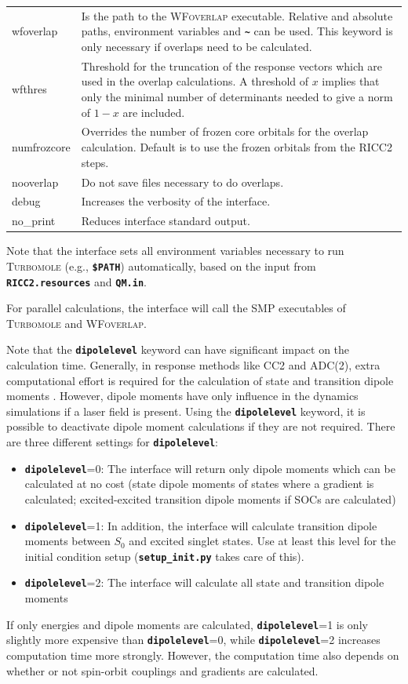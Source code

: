 \documentclass[a4paper,10pt,DIV=15,openany]{scrbook}
\newcommand{\ttt}[1]{\textbf{\texttt{#1}}}
\begin{document}
\begin{table}
\begin{tabular}{>{\ttfamily}lp{12cm}}
wfoverlap       &Is the path to the \textsc{WFoverlap} executable. Relative and absolute paths, environment variables and \ttt{\textasciitilde} can be used. This keyword is only necessary if overlaps need to be calculated.\\
wfthres         &Threshold for the truncation of the response vectors which are used in the overlap calculations. A threshold of $x$ implies that only the minimal number of determinants needed to give a norm of $1-x$ are included.\\
numfrozcore     &Overrides the number of frozen core orbitals for the overlap calculation. Default is to use the frozen orbitals from the RICC2 steps.\\
nooverlap       &Do not save files necessary to do overlaps.\\
debug           &Increases the verbosity of the interface.\\
  no\_print       &Reduces interface standard output.\\
  \hline
  \end{tabular}
\end{table}

Note that the interface sets all environment variables necessary to run \textsc{Turbomole} (e.g., \ttt{\$PATH}) automatically, based on the input from \ttt{RICC2.resources} and \ttt{QM.in}.

For parallel calculations, the interface will call the SMP executables of \textsc{Turbomole} and \textsc{WFoverlap}.

Note that the \ttt{dipolelevel} keyword can have significant impact on the calculation time.
Generally, in response methods like CC2 and ADC(2), extra computational effort is required for the calculation of state and transition dipole moments .
However, dipole moments have only influence in the dynamics simulations if a laser field is present.
Using the \ttt{dipolelevel} keyword, it is possible to deactivate dipole moment calculations if they are not required.
There are three different settings for \ttt{dipolelevel}: 
\begin{itemize}
  \item \ttt{dipolelevel}=0: The interface will return only dipole moments which can be calculated at no cost (state dipole moments of states where a gradient is calculated; excited-excited transition dipole moments if SOCs are calculated)
  \item \ttt{dipolelevel}=1: In addition, the interface will calculate transition dipole moments between $S_0$ and excited singlet states. Use at least this level for the initial condition setup (\ttt{setup\_init.py} takes care of this).
  \item \ttt{dipolelevel}=2: The interface will calculate all state and transition dipole moments
\end{itemize}
If only energies and dipole moments are calculated, \ttt{dipolelevel}=1 is only slightly more expensive than \ttt{dipolelevel}=0, while \ttt{dipolelevel}=2 increases computation time more strongly.
However, the computation time also depends on whether or not spin-orbit couplings and gradients are calculated. 
\end{document}
